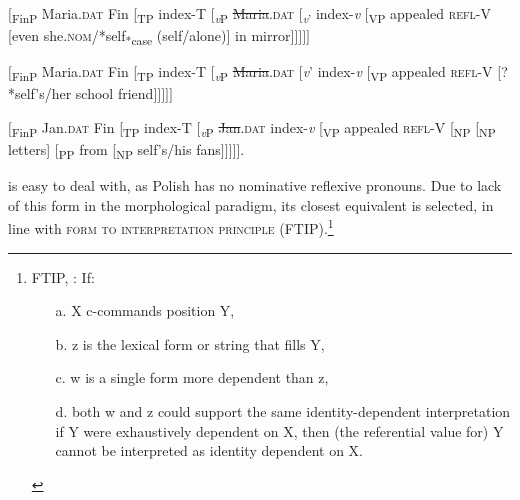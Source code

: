 \documentclass[output=paper,modfonts,nonflat
]{langsci/langscibook}
\begin{document}
\ea \label{ex:witkos:50}
$[$\textsubscript{FinP} Maria.\textsc{dat} Fin [\textsubscript{TP} index-T [\textsubscript{\textit{v}P} \sout{Maria}.\textsc{dat} [\textsubscript{\textit{v}’} index-\textit{v} [\textsubscript{VP} appealed \textsc{refl}-V [even she.\textsc{nom}/*self\textsubscript{*case} (self/alone)] in mirror$]]]]]$\\
\z

\ea \label{ex:witkos:51}
$[$\textsubscript{FinP} Maria.\textsc{dat} Fin [\textsubscript{TP} index-T [\textsubscript{\textit{v}P} \sout{Maria}.\textsc{dat} [\textit{v}’ index-\textit{v} [\textsubscript{VP} appealed \textsc{refl}-V [?*self’s/her school friend$]]]]]$\\
\z

\ea \label{ex:witkos:52}
$[$\textsubscript{FinP} Jan.\textsc{dat} Fin [\textsubscript{TP} index-T [\textsubscript{\textit{v}P} \sout{Jan}.\textsc{dat} index-\textit{v} [\textsubscript{VP} appealed \textsc{refl}-V [\textsubscript{NP} [\textsubscript{NP} letters] [\textsubscript{PP} from [\textsubscript{NP} self’s/his fans$]]]]]$.\\
\z

\largerpage[-1]
\noindent {} is easy to deal with, as Polish has no nominative reflexive pronouns. Due to lack of this form in the morphological paradigm, its closest equivalent is selected, in line with  \textsc{form to interpretation principle} (FTIP).\footnote{\label{fn27}FTIP, \cite{safir2004}: If: 
\begin{itemize}
    \item[a.] X c-commands position Y,
    \item[b.] z is the lexical form or string that fills Y,
    \item[c.] w is a single form more dependent than z,
    \item[d.] both w and z could support the same identity-dependent interpretation if Y were exhaustively dependent on X, then (the referential value for) Y cannot be interpreted as identity dependent on X.\end{itemize}}
\end{document}
